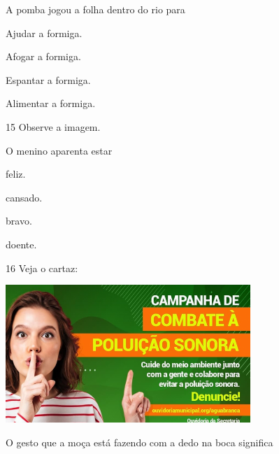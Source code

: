 
A pomba jogou a folha dentro do rio para

\begin{escolha}
\item Ajudar a formiga.

\item Afogar a formiga.

\item Espantar a formiga.

\item Alimentar a formiga.
\end{escolha}


\num{15} Observe a imagem.


O menino aparenta estar

\begin{escolha}
\item feliz.

\item cansado.

\item bravo.

\item doente.
\end{escolha}

\num{16} Veja o cartaz:

\includegraphics[width=3.64744in,height=2.05233in]{media/image173.png}


O gesto que a moça está fazendo com a dedo na boca significa

